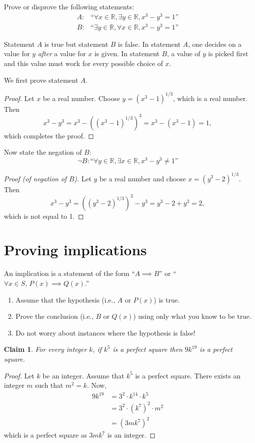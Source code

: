 \documentclass[11pt]{article}
\theoremstyle{plain}
\newtheorem*{claim}{Claim}
\theoremstyle{plain}
\theoremstyle{remark}
\def\reals{\mathbb{R}}
\begin{document}
\begin{tcolorbox}
Prove or disprove the following statements:
\begin{align*}
 A\colon &\text{``}\forall x\in\reals, \exists y\in\reals, x^3-y^3 =1\text{''} \\
 B\colon &\text{``}\exists y\in\reals, \forall x\in\reals, x^3-y^3 =1\text{''}
\end{align*}

\end{tcolorbox}

Statement $A$ is true but statement $B$ is false. In statement $A$, one decides on a value for $y$ \emph{after} a value for $x$ is given. In statement $B$, a value of $y$ is picked first and this value must work for every possible choice of $x$.

We first prove statement $A$.
\begin{proof}
 Let $x$ be a real number. Choose $y=(x^3-1)^{1/3}$, which is a real number. Then
 \[
  x^3-y^3 = x^3-\left((x^3-1)^{1/3}\right)^3 = x^3 - (x^3-1) = 1,
 \]
which completes the proof.
\end{proof}

Now state the negation of $B$:
\[
 \neg B \colon \text{``}\forall y\in\reals, \exists x\in\reals, x^3-y^3 \neq1\text{''}
\]
\begin{proof}[Proof (of negation of $B$)]
 Let $y$ be a real number and choose $x = (y^3-2)^{1/3}$. Then
 \[
  x^3-y^3 = \left((y^3-2)^{1/3}\right)^3- y^3 = y^3 - 2 + y^3 = 2 ,
 \]
which is not equal to 1.
\end{proof}


\section*{Proving implications}
An implication is a statement of the form ``$A\implies B$'' or ``$\forall x\in S,\, P(x)\implies Q(x)$.''
\begin{enumerate}
 \item Assume that the hypothesis (i.e., $A$ or $P(x)$) is true.
 \item Prove the conclusion (i.e., $B$ or $Q(x)$) using only what you know to be true.
 \item Do not worry about instances where the hypothesis is false!
\end{enumerate}


\begin{tcolorbox}
\begin{claim}
 For every integer $k$, if $k^5$ is a perfect square then $9k^{19}$ is a perfect square.
\end{claim}
\end{tcolorbox}
\begin{proof}
Let $k$ be an integer. Assume that $k^5$ is a perfect square. There exists an integer $m$ such that $m^2=k$. Now,
\begin{align*}
 9k^{19} &= 3^2\cdot k^{14} \cdot k^5 \\&= 3^2\cdot (k^7)^2\cdot m^2 \\&= (3mk^7)^2
\end{align*}
which is a perfect square as $3mk^7$ is an integer.
\end{proof}
\end{document}
